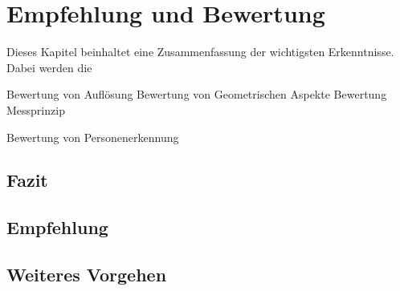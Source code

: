 \chapter{Empfehlung und Bewertung}
\label{Empfehlung_Vorgehen}

Dieses Kapitel beinhaltet eine Zusammenfassung der wichtigsten Erkenntnisse. Dabei werden die 


Bewertung von Auflösung
Bewertung von Geometrischen Aspekte
Bewertung Messprinzip

Bewertung von Personenerkennung

\section{Fazit}
\label{Fazit}


\section{Empfehlung}


\section{Weiteres Vorgehen}



